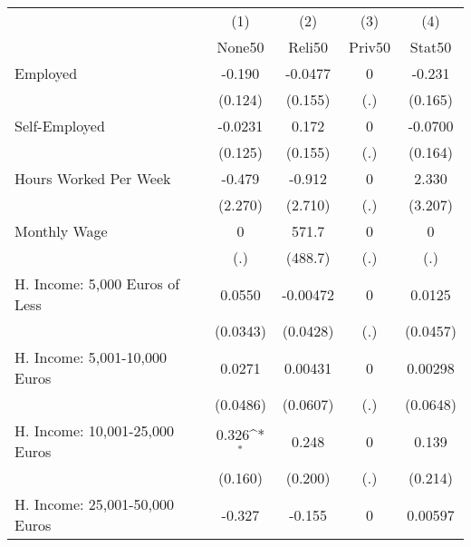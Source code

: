 {
\def\sym#1{\ifmmode^{#1}\else\(^{#1}\)\fi}
\begin{tabular}{l*{4}{c}}
\hline\hline
            &\multicolumn{1}{c}{(1)}&\multicolumn{1}{c}{(2)}&\multicolumn{1}{c}{(3)}&\multicolumn{1}{c}{(4)}\\
            &\multicolumn{1}{c}{None50}&\multicolumn{1}{c}{Reli50}&\multicolumn{1}{c}{Priv50}&\multicolumn{1}{c}{Stat50}\\
\hline
Employed    &      -0.190         &     -0.0477         &           0         &      -0.231         \\
            &     (0.124)         &     (0.155)         &         (.)         &     (0.165)         \\
[1em]
Self-Employed&     -0.0231         &       0.172         &           0         &     -0.0700         \\
            &     (0.125)         &     (0.155)         &         (.)         &     (0.164)         \\
[1em]
Hours Worked Per Week&      -0.479         &      -0.912         &           0         &       2.330         \\
            &     (2.270)         &     (2.710)         &         (.)         &     (3.207)         \\
[1em]
Monthly Wage&           0         &       571.7         &           0         &           0         \\
            &         (.)         &     (488.7)         &         (.)         &         (.)         \\
[1em]
H. Income: 5,000 Euros of Less&      0.0550         &    -0.00472         &           0         &      0.0125         \\
            &    (0.0343)         &    (0.0428)         &         (.)         &    (0.0457)         \\
[1em]
H. Income: 5,001-10,000 Euros&      0.0271         &     0.00431         &           0         &     0.00298         \\
            &    (0.0486)         &    (0.0607)         &         (.)         &    (0.0648)         \\
[1em]
H. Income: 10,001-25,000 Euros&       0.326\sym{*}  &       0.248         &           0         &       0.139         \\
            &     (0.160)         &     (0.200)         &         (.)         &     (0.214)         \\
[1em]
H. Income: 25,001-50,000 Euros&      -0.327         &      -0.155         &           0         &     0.00597         \\

\end{tabular}}
